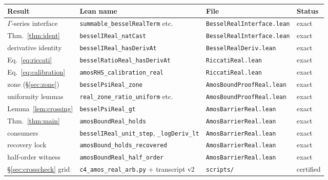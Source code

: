 \documentclass[11pt]{article}
\newcommand{\lean}[1]{\texttt{#1}}
\begin{document}
\begin{center}
\footnotesize
\begin{tabular}{@{}llll@{}}
\toprule
Result & Lean name & File & Status \\
\midrule
$\Gamma$-series interface & \lean{summable\_besselRealTerm} etc. & \lean{BesselRealInterface.lean} & exact \\
Thm.~\ref{thm:ident} & \lean{besselIReal\_natCast} & \lean{BesselRealInterface.lean} & exact \\
derivative identity & \lean{besselIReal\_hasDerivAt} & \lean{BesselRealDeriv.lean} & exact \\
Eq.~\eqref{eq:riccati} & \lean{besselRatioReal\_hasDerivAt} & \lean{RiccatiReal.lean} & exact \\
Eq.~\eqref{eq:calibration} & \lean{amosRHS\_calibration\_real} & \lean{RiccatiReal.lean} & exact \\
zone (\S\ref{sec:zone}) & \lean{besselPsiReal\_zone} & \lean{AmosBoundProofReal.lean} & exact \\
uniformity lemmas & \lean{real\_zone\_ratio\_uniform} etc. & \lean{AmosBoundProofReal.lean} & exact \\
Lemma~\ref{lem:crossing} & \lean{besselPsiReal\_gt} & \lean{AmosBarrierReal.lean} & exact \\
Thm.~\ref{thm:main} & \lean{amosBoundReal\_holds} & \lean{AmosBarrierReal.lean} & exact \\
consumers & \lean{besselIReal\_unit\_step}, \lean{\_logDeriv\_lt} & \lean{AmosBarrierReal.lean} & exact \\
recovery lock & \lean{amosBound\_holds\_recovered} & \lean{AmosBarrierReal.lean} & exact \\
half-order witness & \lean{amosBoundReal\_half\_order} & \lean{AmosBarrierReal.lean} & exact \\
\S\ref{sec:crosscheck} grid & \lean{c4\_amos\_real\_arb.py} + transcript v2 & \lean{scripts/} & certified \\
\bottomrule
\end{tabular}
\end{center}
\end{document}
